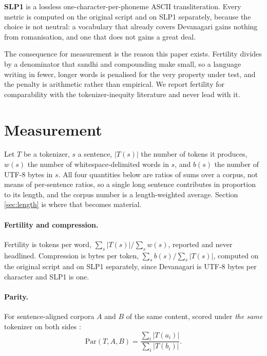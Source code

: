 \documentclass[11pt]{article}
\begin{document}
\textbf{SLP1} is a lossless one-character-per-phoneme ASCII transliteration. Every metric
is computed on the original script and on SLP1 separately, because the choice is not
neutral: a vocabulary that already covers Devanagari gains nothing from romanisation, and
one that does not gains a great deal.

The consequence for measurement is the reason this paper exists. Fertility divides by a
denominator that sandhi and compounding make small, so a language writing in fewer, longer
words is penalised for the very property under test, and the penalty is arithmetic rather
than empirical. We report fertility for comparability with the tokenizer-inequity
literature \citep{petrov-etal-2023-tokenizers,ahia-etal-2023-languages,%
singh-etal-2024-indicgenbench,arnett-etal-2025-inequities} and never lead with it.

\section{Measurement}
\label{sec:measurement}

Let $T$ be a tokenizer, $s$ a sentence, $|T(s)|$ the number of tokens it produces, $w(s)$
the number of whitespace-delimited words in $s$, and $b(s)$ the number of UTF-8 bytes in
$s$. All four quantities below are ratios of sums over a corpus, not means of per-sentence
ratios, so a single long sentence contributes in proportion to its length, and the corpus
number is a length-weighted average. Section \ref{sec:length} is where that becomes
material.

\paragraph{Fertility and compression.} Fertility is tokens per word,
$\sum_{s} |T(s)| / \sum_{s} w(s)$, reported and never headlined. Compression is bytes per
token, $\sum_{s} b(s) / \sum_{s} |T(s)|$, computed on the original script and on SLP1
separately, since Devanagari is \numBytesPerDevanagariChar{} UTF-8 bytes per character and
SLP1 is one.

\paragraph{Parity.} For sentence-aligned corpora $A$ and $B$ of the same content, scored
under \emph{the same} tokenizer on both sides \citep{petrov-etal-2023-tokenizers}:
\begin{equation}
  \mathrm{Par}(T, A, B) = \frac{\sum_{i} |T(a_i)|}{\sum_{i} |T(b_i)|}.
\end{equation}
\end{document}
